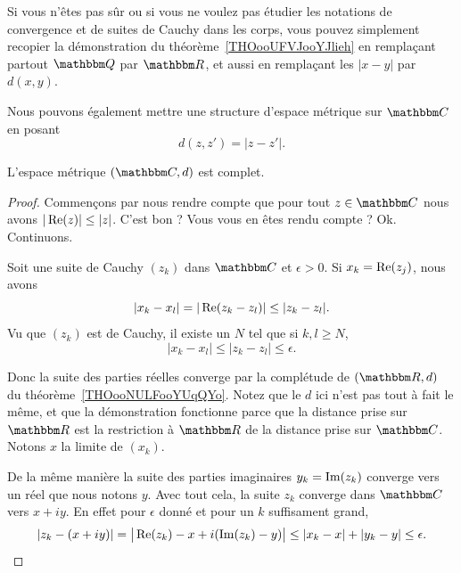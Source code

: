 Si vous n'êtes pas sûr ou si vous ne voulez pas étudier les notations de convergence et de suites de Cauchy dans les corps, vous pouvez simplement recopier la démonstration du théorème~\ref{THOooUFVJooYJlieh} en remplaçant partout \( \eQ\) par \( \eR\), et aussi en remplaçant les \( | x-y |\) par \( d(x,y)\).

\begin{normaltext}
    Nous pouvons également mettre une structure d'espace métrique sur \( \eC\) en posant
    \begin{equation}
        d(z,z')=| z-z' |.
    \end{equation}
\end{normaltext}

\begin{proposition}
    L'espace métrique \( (\eC,d)\) est complet.
\end{proposition}

\begin{proof}
    Commençons par nous rendre compte que pour tout \( z\in \eC\) nous avons \( | \operatorname{Re}(z) |\leq | z |\). C'est bon ? Vous vous en êtes rendu compte ? Ok. Continuons.

    Soit une suite de Cauchy \( (z_k)\) dans \( \eC\) et \( \epsilon>0\). Si \( x_k=\operatorname{Re}(z_j)\), nous avons
    \begin{equation}
        | x_k-x_l |=| \operatorname{Re}(z_k-z_l) |\leq | z_k-z_l |.
    \end{equation}
    Vu que \( (z_k)\) est de Cauchy, il existe un \( N\) tel que si \( k,l\geq N\),
    \begin{equation}
        | x_k-x_l |\leq | z_k-z_l |\leq \epsilon.
    \end{equation}

    Donc la suite des parties réelles converge par la complétude de \( (\eR,d)\) du théorème~\ref{THOooNULFooYUqQYo}. Notez que le \( d\) ici n'est pas tout à fait le même, et que la démonstration fonctionne parce que la distance prise sur \( \eR\) est la restriction à \( \eR\) de la distance prise sur \( \eC\). Notons \( x\) la limite de \( (x_k)\).

    De la même manière la suite des parties imaginaires \( y_k=\operatorname{Im}(z_k)\) converge vers un réel que nous notons \( y\). Avec tout cela, la suite \( z_k\) converge dans \( \eC\) vers \( x+iy\). En effet pour \( \epsilon\) donné et pour un \( k\) suffisament grand,
    \begin{equation}
        | z_k-(x+iy) |=\big| \operatorname{Re}(z_k)-x+i(\operatorname{Im}(z_k)-y) \big|\leq | x_k-x |+| y_k-y |\leq \epsilon.
    \end{equation}
\end{proof}

